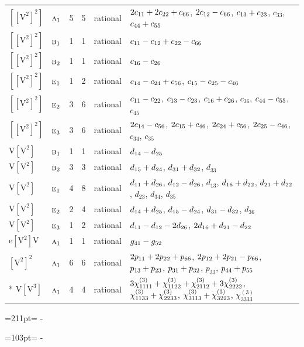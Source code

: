 \documentclass[10pt,a4paper]{article}
\newcommand{\needspace}[1]{\par\penalty-100\begingroup\dimen0=#1\relax\dimen2=\pagegoal
  \advance\dimen2-\pagetotal\ifdim\dimen0>\dimen2\relax\ifdim\dimen2>0pt\vfil\break\fi\fi
  \endgroup}
\numberwithin{equation}{section}
\newcommand{\irr}[1]{\text{\normalfont\scshape #1}}
\newcommand{\jahn}[1]{\mathrm{#1}}
\newlength{\fillwidth}\newlength{\cellwidth}\newlength{\colwidth}
\newcommand{\signbreak}{\penalty100\relax}
\begin{document}
{\begin{longtable}{@{}llrrl>{\RaggedRight\arraybackslash}p{\fillwidth}@{}}
$\jahn{[[V^{2}]^{2}]}$ & $\irr{a}_{1}$ & 5 & 5 & rational & $2c_{11} +\signbreak 2c_{22} +\signbreak c_{66}$, $2c_{12} -\signbreak c_{66}$, $c_{13} +\signbreak c_{23}$, $c_{33}$, $c_{44} +\signbreak c_{55}$\\
$\jahn{[[V^{2}]^{2}]}$ & $\irr{b}_{1}$ & 1 & 1 & rational & $c_{11} -\signbreak c_{12} +\signbreak c_{22} -\signbreak c_{66}$\\
$\jahn{[[V^{2}]^{2}]}$ & $\irr{b}_{2}$ & 1 & 1 & rational & $c_{16} -\signbreak c_{26}$\\
$\jahn{[[V^{2}]^{2}]}$ & $\irr{e}_{1}$ & 1 & 2 & rational & $c_{14} -\signbreak c_{24} +\signbreak c_{56}$, $c_{15} -\signbreak c_{25} -\signbreak c_{46}$\\
$\jahn{[[V^{2}]^{2}]}$ & $\irr{e}_{2}$ & 3 & 6 & rational & $c_{11} -\signbreak c_{22}$, $c_{13} -\signbreak c_{23}$, $c_{16} +\signbreak c_{26}$, $c_{36}$, $c_{44} -\signbreak c_{55}$, $c_{45}$\\
$\jahn{[[V^{2}]^{2}]}$ & $\irr{e}_{3}$ & 3 & 6 & rational & $2c_{14} -\signbreak c_{56}$, $2c_{15} +\signbreak c_{46}$, $2c_{24} +\signbreak c_{56}$, $2c_{25} -\signbreak c_{46}$, $c_{34}$, $c_{35}$\\
$\jahn{V[V^{2}]}$ & $\irr{b}_{1}$ & 1 & 1 & rational & $d_{14} -\signbreak d_{25}$\\
$\jahn{V[V^{2}]}$ & $\irr{b}_{2}$ & 3 & 3 & rational & $d_{15} +\signbreak d_{24}$, $d_{31} +\signbreak d_{32}$, $d_{33}$\\
$\jahn{V[V^{2}]}$ & $\irr{e}_{1}$ & 4 & 8 & rational & $d_{11} +\signbreak d_{26}$, $d_{12} -\signbreak d_{26}$, $d_{13}$, $d_{16} +\signbreak d_{22}$, $d_{21} +\signbreak d_{22}$, $d_{23}$, $d_{34}$, $d_{35}$\\
$\jahn{V[V^{2}]}$ & $\irr{e}_{2}$ & 2 & 4 & rational & $d_{14} +\signbreak d_{25}$, $d_{15} -\signbreak d_{24}$, $d_{31} -\signbreak d_{32}$, $d_{36}$\\
$\jahn{V[V^{2}]}$ & $\irr{e}_{3}$ & 1 & 2 & rational & $d_{11} -\signbreak d_{12} -\signbreak 2d_{26}$, $2d_{16} +\signbreak d_{21} -\signbreak d_{22}$\\
$\jahn{e[V^{2}]V}$ & $\irr{a}_{1}$ & 1 & 1 & rational & $\mathnormal{g}_{41} -\signbreak \mathnormal{g}_{52}$\\
$\jahn{[V^{2}]^{2}}$ & $\irr{a}_{1}$ & 6 & 6 & rational & $2p_{11} +\signbreak 2p_{22} +\signbreak p_{66}$, $2p_{12} +\signbreak 2p_{21} -\signbreak p_{66}$, $p_{13} +\signbreak p_{23}$, $p_{31} +\signbreak p_{32}$, $p_{33}$, $p_{44} +\signbreak p_{55}$\\*
$\jahn{V[V^{3}]}$ & $\irr{a}_{1}$ & 4 & 4 & rational & $3\chi^{(3)}_{1111} +\signbreak \chi^{(3)}_{1122} +\signbreak \chi^{(3)}_{2112} +\signbreak 3\chi^{(3)}_{2222}$, $\chi^{(3)}_{1133} +\signbreak \chi^{(3)}_{2233}$, $\chi^{(3)}_{3113} +\signbreak \chi^{(3)}_{3223}$, $\chi^{(3)}_{3333}$\\
\bottomrule\end{longtable}}
\needspace{211pt}
\needspace{103pt}
\end{document}
